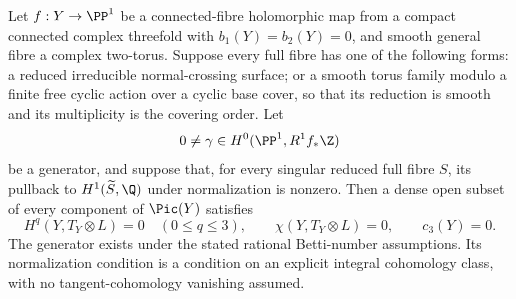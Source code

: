 
\begin{proposition}\label{cdp:st:C4a}
Let $f:Y\to\PP^1$ be a connected-fibre holomorphic map from a compact connected complex threefold with $b_1(Y)=b_2(Y)=0$, and smooth general fibre a complex two-torus. Suppose every full fibre has one of the following forms: a reduced irreducible normal-crossing surface; or a smooth torus family modulo a finite free cyclic action over a cyclic base cover, so that its reduction is smooth and its multiplicity is the covering order. Let
\[
 0\ne\gamma\in H^0(\PP^1,R^1f_*\Z)
\]
be a generator, and suppose that, for every singular reduced full fibre $S$, its pullback to $H^1(\widetilde S,\Q)$ under normalization is nonzero. Then a dense open subset of every component of $\Pic(Y)$ satisfies
\[
 H^q(Y,T_Y\otimes L)=0\quad(0\le q\le3),\qquad
 \chi(Y,T_Y\otimes L)=0,\qquad c_3(Y)=0.                \tag{C.15}\label{cdp:eq:C.15}
\]
The generator exists under the stated rational Betti-number assumptions. Its normalization condition is a condition on an explicit integral cohomology class, with no tangent-cohomology vanishing assumed.
\end{proposition}

